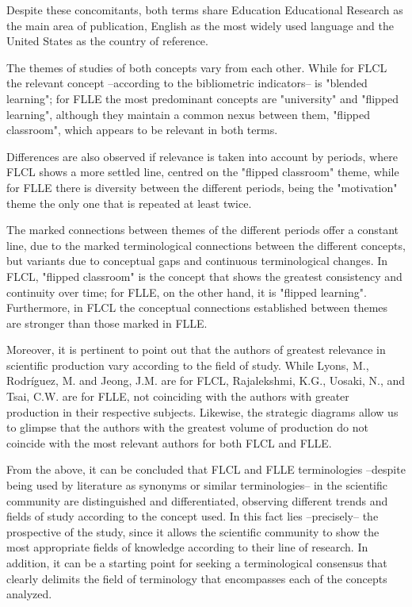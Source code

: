 \documentclass{textolivre}
\begin{document}
Despite these concomitants, both terms share Education Educational Research as the main area of publication, English as the most widely used language and the United States as the country of reference.

The themes of studies of both concepts vary from each other. While for FLCL the relevant concept –according to the bibliometric indicators– is "blended learning"; for FLLE the most predominant concepts are "university" and "flipped learning", although they maintain a common nexus between them, "flipped classroom", which appears to be relevant in both terms.

Differences are also observed if relevance is taken into account by periods, where FLCL shows a more settled line, centred on the "flipped classroom" theme, while for FLLE there is diversity between the different periods, being the "motivation" theme the only one that is repeated at least twice.

The marked connections between themes of the different periods offer a constant line, due to the marked terminological connections between the different concepts, but variants due to conceptual gaps and continuous terminological changes. In FLCL, "flipped classroom" is the concept that shows the greatest consistency and continuity over time; for FLLE, on the other hand, it is "flipped learning". Furthermore, in FLCL the conceptual connections established between themes are stronger than those marked in FLLE.

Moreover, it is pertinent to point out that the authors of greatest relevance in scientific production vary according to the field of study. While Lyons, M., Rodríguez, M. and Jeong, J.M. are for FLCL, Rajalekshmi, K.G., Uosaki, N., and Tsai, C.W. are for FLLE, not coinciding with the authors with greater production in their respective subjects. Likewise, the strategic diagrams allow us to glimpse that the authors with the greatest volume of production do not coincide with the most relevant authors for both FLCL and FLLE.

From the above, it can be concluded that FLCL and FLLE terminologies –despite being used by literature as synonyms or similar terminologies– in the scientific community are distinguished and differentiated, observing different trends and fields of study according to the concept used. In this fact lies –precisely– the prospective of the study, since it allows the scientific community to show the most appropriate fields of knowledge according to their line of research. In addition, it can be a starting point for seeking a terminological consensus that clearly delimits the field of terminology that encompasses each of the concepts analyzed.
\end{document}
